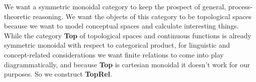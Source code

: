 \begin{fullwidth}
 We want a symmetric monoidal category to keep the prospect of general, process-theoretic reasoning. We want the objects of this category to be topological spaces because we want to model conceptual spaces and calculate interesting things. While the category \textbf{Top} of topological spaces and continuous functions is already symmetric monoidal with respect to categorical product, for linguistic and concept-related considerations we want finite relations to come into play diagrammatically, and because \textbf{Top} is cartesian monoidal it doesn't work for our purposes. So we construct \textbf{TopRel}.

\end{fullwidth}
